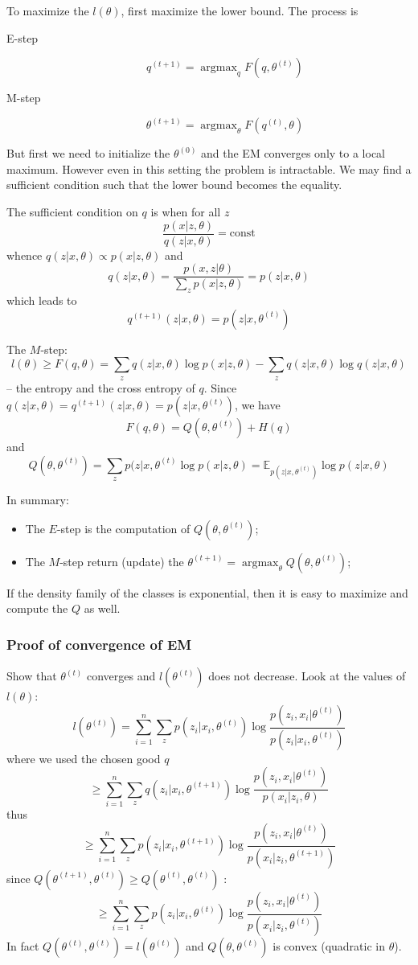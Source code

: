\documentclass[a4paper]{article}
\newcommand{\ex}{\mathbb{E}}
\newcommand{\argmax}{\mathop{\text{argmax}}}
\begin{document}
To maximize the $l(\theta)$, first maximize the lower bound. The process is
\begin{description}
	\item[E-step] \[q^{(t+1)} = \argmax_q F(q,\theta^{(t)})\]
	\item[M-step] \[\theta^{(t+1)} = \argmax_\theta F(q^{(t)},\theta)\]
\end{description}
But first we need to initialize the $\theta^{(0)}$ and the EM converges only to a local maximum.
However even in this setting the problem is intractable. We may find a sufficient condition such that the lower bound becomes the equality.

The sufficient condition on $q$ is when for all $z$
\[\frac{p(x\vert z, \theta)}{q(z\vert x,\theta)} = \text{const}\]
whence $q(z\vert x,\theta) \propto p(x\vert z, \theta)$ and 
\[q(z\vert x,\theta) = \frac{p(x, z\vert \theta)}{\sum_z p(x\vert z, \theta)} = p(z\vert x, \theta)\]
which leads to 
\[q^{(t+1)}(z\vert x,\theta) = p(z\vert x, \theta^{(t)})\]

The $M$-step:
\[l(\theta) \geq F(q,\theta) = \sum_z q(z\vert x,\theta) \log p(x\vert z, \theta) - \sum_z q(z\vert x,\theta) \log q(z\vert x,\theta)\]
-- the entropy and the cross entropy of $q$.
Since $q(z\vert x,\theta) = q^{(t+1)}(z\vert x,\theta) = p(z\vert x, \theta^{(t)})$, we have
\[F(q,\theta) = Q(\theta, \theta^{(t)}) + H(q)\]
and
\[Q(\theta, \theta^{(t)}) = \sum_z p(z\vert x, \theta^{(t)} \log p(x\vert z, \theta)
= \ex_{p(z\vert x, \theta^{(t)})} \log p(z\vert x, \theta) \]

In summary: \begin{itemize}
	\item The $E$-step is the computation of $Q(\theta, \theta^{(t)})$;
	\item The $M$-step return (update) the $\theta^{(t+1)} = \argmax_\theta Q(\theta, \theta^{(t)})$;
\end{itemize}
If the density family of the classes is exponential, then it is easy to maximize and compute the $Q$ as well.

\subsubsection{Proof of convergence of EM} %
\label{ssub:proof_of_convergence_of_em}

Show that $\theta^{(t)}$ converges and $l(\theta^{(t)})$ does not decrease.
Look at the values of $l(\theta)$:
\[l(\theta^{(t)}) = \sum_{i=1}^n \sum_z p(z_i\vert x_i, \theta^{(t)}) \log \frac{p(z_i, x_i\vert \theta^{(t)})}{p(z_i\vert x_i, \theta^{(t)})}\]
where we used the chosen good $q$
\[\geq \sum_{i=1}^n \sum_z q(z_i\vert x_i, \theta^{(t+1)}) \log \frac{p(z_i, x_i\vert \theta^{(t)})}{p(x_i\vert z_i, \theta)}\]
thus
\[\geq \sum_{i=1}^n \sum_z p(z_i\vert x_i, \theta^{(t+1)}) \log \frac{p(z_i, x_i\vert \theta^{(t)})}{p(x_i\vert z_i, \theta^{(t+1)})}\]
since $Q(\theta^{(t+1)}, \theta^{(t)}) \geq Q(\theta^{(t)}, \theta^{(t)})$ :
\[\geq \sum_{i=1}^n \sum_z p(z_i\vert x_i, \theta^{(t)}) \log \frac{p(z_i, x_i\vert \theta^{(t)})}{p(x_i\vert z_i, \theta^{(t)})}\]
In fact $Q(\theta^{(t)}, \theta^{(t)}) = l(\theta^{(t)})$ and $Q(\theta, \theta^{(t)})$ is convex (quadratic in $\theta$).
\end{document}
